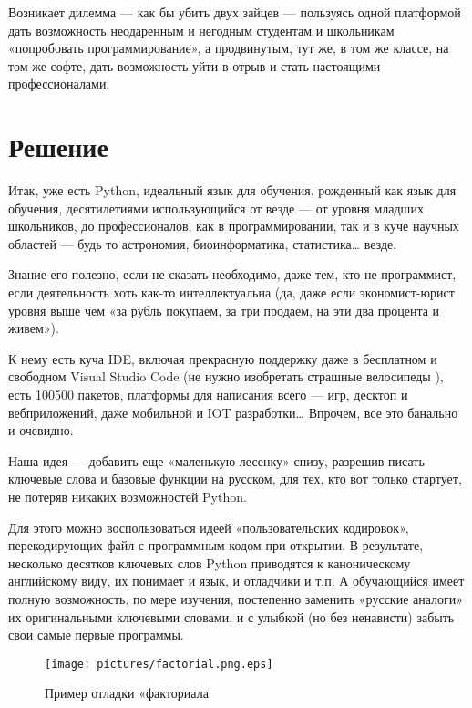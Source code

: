 ﻿\documentclass[a4paper,12pt]{article}
\begin{document}
Возникает дилемма --- как бы убить двух зайцев --- пользуясь одной
платформой дать возможность неодаренным и негодным
студентам и школьникам \cite{students-sucks} «попробовать программирование», а продвинутым,
тут же, в том же классе, на том же софте, дать возможность уйти в отрыв
и стать настоящими профессионалами.

\section{Решение}

Итак, уже есть Python, идеальный язык для обучения, рожденный как язык
для обучения, десятилетиями использующийся от везде --- от уровня
младших школьников, до профессионалов, как в программировании, так и в
куче научных областей --- будь то астрономия, биоинформатика,
статистика\ldots{} везде.

Знание его полезно, если не сказать необходимо, даже тем, кто не
программист, если деятельность хоть как-то интеллектуальна (да, даже
если экономист-юрист уровня выше чем «за рубль покупаем, за три продаем,
на эти два процента и живем»).

К нему есть куча IDE, включая прекрасную поддержку даже в бесплатном и
свободном Visual Studio Code (не нужно
изобретать страшные велосипеды \cite{ide-python}), есть
100500 пакетов, платформы для написания всего --- игр, десктоп и
вебприложений, даже мобильной и IOT разработки\ldots{} Впрочем, все это
банально и очевидно.
 
Наша идея --- добавить еще «маленькую лесенку» снизу, разрешив писать
ключевые слова и базовые функции на русском, для тех, кто вот только
стартует, не потеряв никаких возможностей Python.

Для этого можно воспользоваться идеей «пользовательских кодировок»,
перекодирующих файл с программным кодом при открытии. В результате,
несколько десятков ключевых слов Python приводятся к каноническому
английскому виду, их понимает и язык, и отладчики и т.п. А обучающийся
имеет полную возможность, по мере изучения, постепенно заменить «русские
аналоги» их оригинальными ключевыми словами, и с улыбкой (но без
ненависти) забыть свои самые первые программы.

\begin{figure}
\centering
\texttt{[image: pictures/factorial.png.eps]}
\caption{Пример отладки «факториала}
\end{figure}
\end{document}
